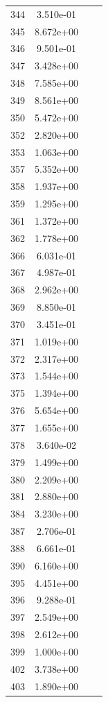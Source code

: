 \documentclass[12pt]{article}
\begin{document}
\begin{longtable}{@{}cccc@{}}
344 & 3.510e-01 &  &  \\
345 & 8.672e+00 &  &  \\
346 & 9.501e-01 &  &  \\
347 & 3.428e+00 &  &  \\
348 & 7.585e+00 &  &  \\
349 & 8.561e+00 &  &  \\
350 & 5.472e+00 &  &  \\
352 & 2.820e+00 &  &  \\
353 & 1.063e+00 &  &  \\
357 & 5.352e+00 &  &  \\
358 & 1.937e+00 &  &  \\
359 & 1.295e+00 &  &  \\
361 & 1.372e+00 &  &  \\
362 & 1.778e+00 &  &  \\
366 & 6.031e-01 &  &  \\
367 & 4.987e-01 &  &  \\
368 & 2.962e+00 &  &  \\
369 & 8.850e-01 &  &  \\
370 & 3.451e-01 &  &  \\
371 & 1.019e+00 &  &  \\
372 & 2.317e+00 &  &  \\
373 & 1.544e+00 &  &  \\
375 & 1.394e+00 &  &  \\
376 & 5.654e+00 &  &  \\
377 & 1.655e+00 &  &  \\
378 & 3.640e-02 &  &  \\
379 & 1.499e+00 &  &  \\
380 & 2.209e+00 &  &  \\
381 & 2.880e+00 &  &  \\
384 & 3.230e+00 &  &  \\
387 & 2.706e-01 &  &  \\
388 & 6.661e-01 &  &  \\
390 & 6.160e+00 &  &  \\
395 & 4.451e+00 &  &  \\
396 & 9.288e-01 &  &  \\
397 & 2.549e+00 &  &  \\
398 & 2.612e+00 &  &  \\
399 & 1.000e+00 &  &  \\
402 & 3.738e+00 &  &  \\
403 & 1.890e+00 &  &  \\

\end{longtable}
\end{document}
